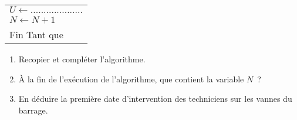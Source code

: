 \begin{enumerate}
\begin{center}
\begin{extern}
\begin{tabular}{|p{5cm}|}
               \hspace{1cm} $U \leftarrow ....................$\\
               \hspace{1cm} $N\leftarrow N+1$\\
               Fin Tant que\\
               \hline
          \end{tabular}
     \end{extern}
          \end{center}
     \begin{enumerate}[label=\alph*.]
          \item Recopier et compléter l'algorithme.
          \item À la fin de l'exécution de l'algorithme, que contient la variable $N$~?
          \item En déduire la première date d'intervention des techniciens sur les vannes du barrage.
     \end{enumerate}
     \end{enumerate}

